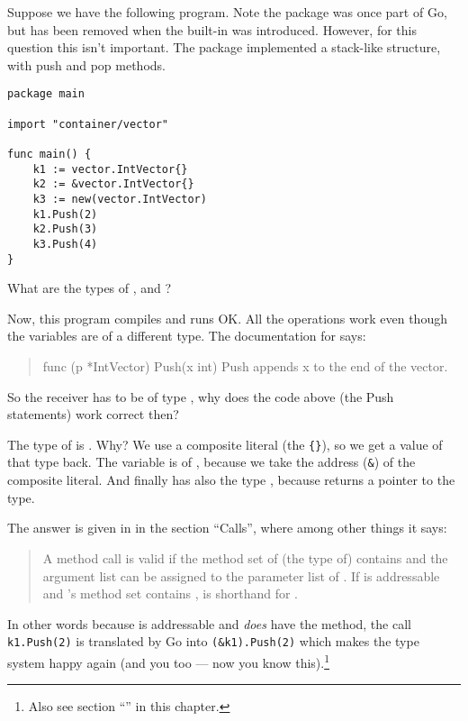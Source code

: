 \begin{Exercise}[title={Method calls},difficulty=8]
\label{ex:methodcalls}
\Question \label{ex:methodcalls q1} Suppose we have the following
program. Note the package  was once part
of Go, but has been removed when the  built-in was introduced.
However, for this question this isn't important. The package implemented
a stack-like structure, with push and pop methods.
\begin{lstlisting}
package main

import "container/vector"

func main() {
	k1 := vector.IntVector{}
	k2 := &vector.IntVector{}
	k3 := new(vector.IntVector)
	k1.Push(2)
	k2.Push(3)
	k3.Push(4)
}
\end{lstlisting}
What are the types of ,  and ?

\Question Now, this program compiles and runs OK. All the 
operations work even though the variables are of a different type. The
documentation for  says:
\begin{quote}
func (p *IntVector) Push(x int)
Push appends x to the end of the vector.
\end{quote}
So the receiver has to be of type , why does the code
above (the Push statements) work correct then?

\end{Exercise}

\begin{Answer}
\Question The type of  is . Why? We use 
a composite literal (the \verb|{}|), so we get a value of that type
back. The variable  is of , because we
take the address (\verb|&|) of the composite literal. And finally
 has also the type , because 
returns a pointer to the type.

\Question The answer is given in \cite{go_spec} in the section ``Calls'',
where among other things it says:
\begin{quote}
A method call  is valid if the method set of (the type of)
contains  and the argument list can be assigned to the parameter list
of . If  is addressable and 's method set
contains ,  is shorthand for .
\end{quote}
In other words because  is addressable and
 \emph{does} have the  method, the
call \lstinline{k1.Push(2)} is translated by Go into 
\lstinline{(&k1).Push(2)} which makes the type system happy again (and
you too --- now you know this).\footnote{Also see section
``'' in this chapter.}

\end{Answer}
